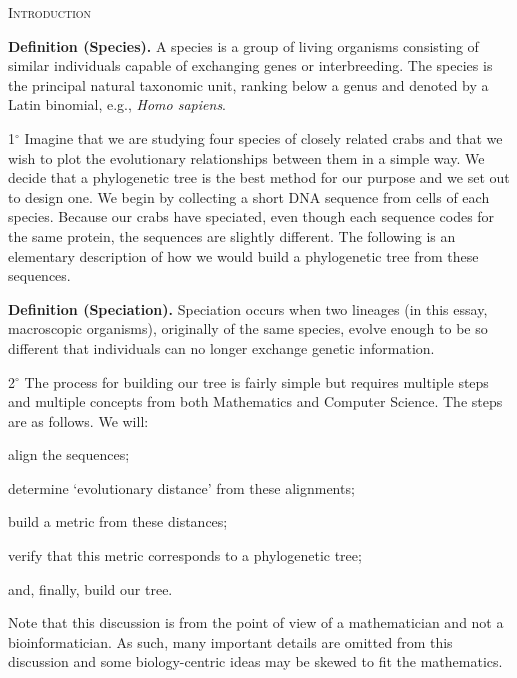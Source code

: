 \documentclass[a4paper]{article}
\begin{document}
\textsc{Introduction} \\

\begin{adjustwidth}{.5in}{0pt}
\textbf{Definition (Species).} A species is a group of living organisms consisting of similar individuals capable of exchanging genes or interbreeding. The species is the principal natural taxonomic unit, ranking below a genus and denoted by a Latin binomial, e.g., \emph{Homo sapiens}. \\
\end{adjustwidth}

1$^\circ$ Imagine that we are studying four species of closely related crabs and that we wish to plot the evolutionary relationships between them in a simple way. We decide that a phylogenetic tree is the best method for our purpose and we set out to design one. We begin by collecting a short DNA sequence from cells of  each species. Because our crabs have speciated, even though each sequence codes for the same protein, the sequences are slightly different. The following is an elementary description of how we would build a phylogenetic tree from these sequences. \\

\begin{adjustwidth}{.5in}{0pt}
\textbf{Definition (Speciation).} Speciation occurs when two lineages (in this essay, macroscopic organisms), originally of the same species, evolve enough to be so different that individuals can no longer exchange genetic information. \\
\end{adjustwidth}


2$^\circ$ The process for building our tree is fairly simple but requires multiple steps and multiple concepts from both Mathematics and Computer Science. The steps are as follows. We will:

\begin{itemize*}
\item align the sequences;
\item determine `evolutionary distance' from these alignments;
\item build a metric from these distances;
\item verify that this metric corresponds to a phylogenetic tree;
\item and, finally, build our tree. 
\end{itemize*}

Note that this discussion is from the point of view of a mathematician and not a bioinformatician. As such, many important details are omitted from this discussion and some biology-centric ideas may be skewed to fit the mathematics. \\
\end{document}
